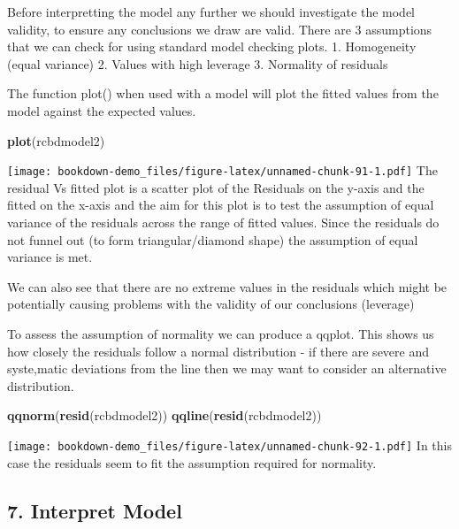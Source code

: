 \documentclass[]{book}
\newenvironment{Shaded}{\begin{snugshade}}{\end{snugshade}}
\newcommand{\KeywordTok}[1]{\textcolor[rgb]{0.13,0.29,0.53}{\textbf{#1}}}
\newcommand{\NormalTok}[1]{#1}
\theoremstyle{definition}
\theoremstyle{definition}
\theoremstyle{definition}
\theoremstyle{remark}
\begin{document}
Before interpretting the model any further we should investigate the
model validity, to ensure any conclusions we draw are valid. There are 3
assumptions that we can check for using standard model checking plots.
1. Homogeneity (equal variance) 2. Values with high leverage 3.
Normality of residuals

The function plot() when used with a model will plot the fitted values
from the model against the expected values.

\begin{Shaded}
\begin{Highlighting}[]
\KeywordTok{plot}\NormalTok{(rcbdmodel2)}
\end{Highlighting}
\end{Shaded}

\texttt{[image: bookdown-demo\_files/figure-latex/unnamed-chunk-91-1.pdf]}
The residual Vs fitted plot is a scatter plot of the Residuals on the
y-axis and the fitted on the x-axis and the aim for this plot is to test
the assumption of equal variance of the residuals across the range of
fitted values. Since the residuals do not funnel out (to form
triangular/diamond shape) the assumption of equal variance is met.

We can also see that there are no extreme values in the residuals which
might be potentially causing problems with the validity of our
conclusions (leverage)

To assess the assumption of normality we can produce a qqplot. This
shows us how closely the residuals follow a normal distribution - if
there are severe and syste,matic deviations from the line then we may
want to consider an alternative distribution.

\begin{Shaded}
\begin{Highlighting}[]
\KeywordTok{qqnorm}\NormalTok{(}\KeywordTok{resid}\NormalTok{(rcbdmodel2))}
\KeywordTok{qqline}\NormalTok{(}\KeywordTok{resid}\NormalTok{(rcbdmodel2))}
\end{Highlighting}
\end{Shaded}

\texttt{[image: bookdown-demo\_files/figure-latex/unnamed-chunk-92-1.pdf]}
In this case the residuals seem to fit the assumption required for
normality.

\subsection{7. Interpret Model}\label{interpret-model-2}
\end{document}
